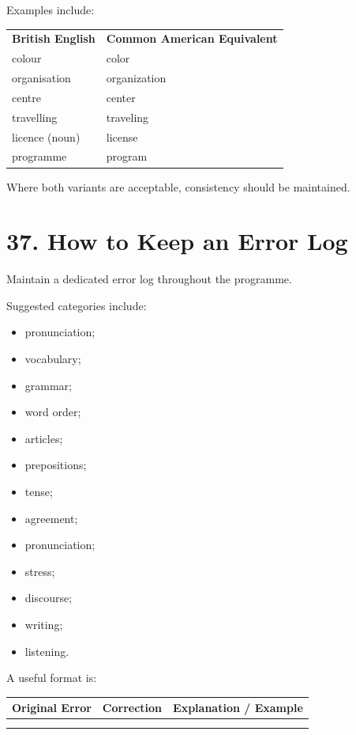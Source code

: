 Examples include:

\begin{center}
\begin{tabular}{ll}
\textbf{British English} & \textbf{Common American Equivalent} \\
colour & color \\
organisation & organization \\
centre & center \\
travelling & traveling \\
licence (noun) & license \\
programme & program \\
\end{tabular}
\end{center}

Where both variants are acceptable, consistency should be maintained.

\section*{37. How to Keep an Error Log}

Maintain a dedicated error log throughout the programme.

Suggested categories include:

\begin{itemize}
    \item pronunciation;
    \item vocabulary;
    \item grammar;
    \item word order;
    \item articles;
    \item prepositions;
    \item tense;
    \item agreement;
    \item pronunciation;
    \item stress;
    \item discourse;
    \item writing;
    \item listening.
\end{itemize}

A useful format is:

\begin{center}
\begin{tabular}{|p{4cm}|p{4cm}|p{6cm}|}
\hline
\textbf{Original Error} & \textbf{Correction} & \textbf{Explanation / Example} \\
\hline
 & & \\
\hline
 & & \\
\hline
\end{tabular}
\end{center}

